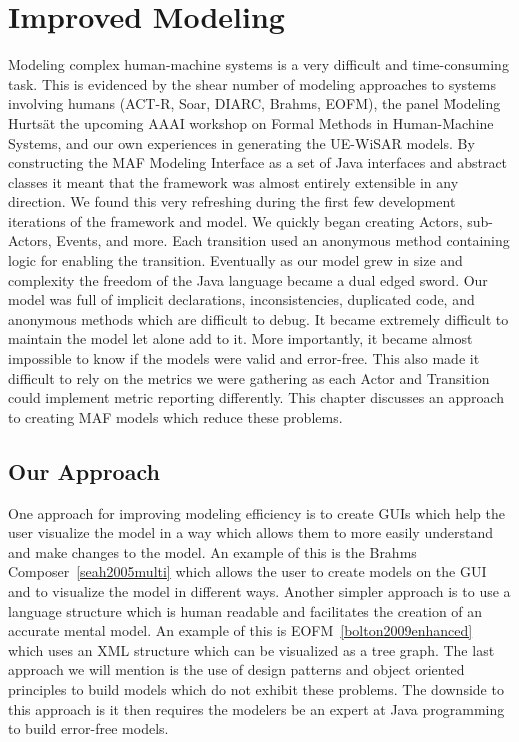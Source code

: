 \chapter{Improved Modeling}

Modeling complex human-machine systems is a very difficult and time-consuming task.  This is evidenced by the shear number of modeling approaches to systems involving humans (ACT-R, Soar, DIARC, Brahms, EOFM), the panel \"Modeling Hurts\" at the upcoming AAAI workshop on Formal Methods in Human-Machine Systems, and our own experiences in generating the UE-WiSAR models.  By constructing the MAF Modeling Interface as a set of Java interfaces and abstract classes it meant that the framework was almost entirely extensible in any direction.  We found this very refreshing during the first few development iterations of the framework and model.  We quickly began creating Actors, sub-Actors, Events, and more.  Each transition used an anonymous method containing logic for enabling the transition.  Eventually as our model grew in size and complexity the freedom of the Java language became a dual edged sword.  Our model was full of implicit declarations, inconsistencies, duplicated code, and anonymous methods which are difficult to debug.  It became extremely difficult to maintain the model let alone add to it.  More importantly, it became almost impossible to know if the models were valid and error-free.  This also made it difficult to rely on the metrics we were gathering as each Actor and Transition could implement metric reporting differently.  This chapter discusses an approach to creating MAF models which reduce these problems.

\section{Our Approach}

One approach for improving modeling efficiency is to create GUIs which help the user visualize the model in a way which allows them to more easily understand and make changes to the model.  An example of this is the Brahms Composer~\ref{seah2005multi} which allows the user to create models on the GUI and to visualize the model in different ways.  Another simpler approach is to use a language structure which is human readable and facilitates the creation of an accurate mental model.  An example of this is EOFM~\ref{bolton2009enhanced} which uses an XML structure which can be visualized as a tree graph.  The last approach we will mention is the use of design patterns and object oriented principles to build models which do not exhibit these problems.  The downside to this approach is it then requires the modelers be an expert at Java programming to build error-free models.

